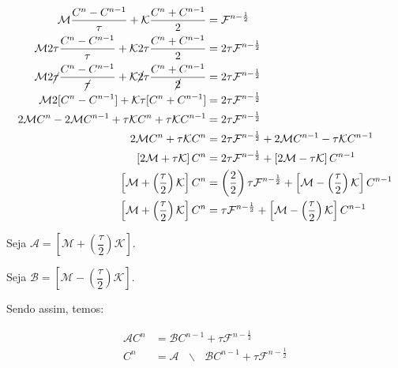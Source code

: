   \begin{align*}
    \mathcal{M} \dfrac{C^n - C^{n-1}}{\tau} + \mathcal{K} \dfrac{C^n + C^{n-1}}{2} &= \mathcal{F}^{n - \frac{1}{2}}\\
    \mathcal{M} 2\tau \dfrac{C^n - C^{n-1}}{\tau} + \mathcal{K} 2\tau \dfrac{C^n + C^{n-1}}{2} &= 2\tau \mathcal{F}^{n - \frac{1}{2}}\\
    \mathcal{M} 2\cancel{\tau} \dfrac{C^n - C^{n-1}}{\cancel{\tau}} + \mathcal{K} \cancel{2}\tau \dfrac{C^n + C^{n-1}}{\cancel{2}} &= 2\tau \mathcal{F}^{n - \frac{1}{2}}\\
    \mathcal{M} 2 [C^n - C^{n-1}] + \mathcal{K} \tau [C^n + C^{n-1}] &= 2\tau \mathcal{F}^{n - \frac{1}{2}}\\
    2\mathcal{M}C^n - 2\mathcal{M}C^{n-1} + \tau\mathcal{K}C^n + \tau\mathcal{K}C^{n-1} &= 2\tau \mathcal{F}^{n - \frac{1}{2}}\\
    2\mathcal{M}C^n + \tau\mathcal{K}C^n &= 2\tau \mathcal{F}^{n - \frac{1}{2}} + 2\mathcal{M}C^{n-1} - \tau\mathcal{K}C^{n-1}\\
    \left[2\mathcal{M} + \tau\mathcal{K}\right]C^n &= 2\tau \mathcal{F}^{n - \frac{1}{2}} + \left[2\mathcal{M} - \tau\mathcal{K}\right]C^{n-1} \\
    \left[\mathcal{M} + \left(\dfrac{\tau}{2}\right)\mathcal{K}\right]C^n &= \left(\dfrac{2}{2}\right)\tau \mathcal{F}^{n - \frac{1}{2}} + \left[\mathcal{M} - \left(\dfrac{\tau}{2}\right)\mathcal{K}\right]C^{n-1} \\
    \left[\mathcal{M} + \left(\dfrac{\tau}{2}\right)\mathcal{K}\right]C^n &= \tau \mathcal{F}^{n - \frac{1}{2}} + \left[\mathcal{M} - \left(\dfrac{\tau}{2}\right)\mathcal{K}\right]C^{n-1}
  \end{align*}

  Seja $\displaystyle \mathcal{A} = \left[\mathcal{M} + \left(\dfrac{\tau}{2}\right)\mathcal{K}\right]$.

  Seja $\displaystyle \mathcal{B} = \left[\mathcal{M} - \left(\dfrac{\tau}{2}\right)\mathcal{K}\right]$.

  Sendo assim, temos:

  \begin{align*}
    \mathcal{A} C^n &= \mathcal{B} C^{n-1} + \tau \mathcal{F}^{n - \frac{1}{2}} \\
    C^n &= \mathcal{A}\text{ }\backslash \text{ }\mathcal{B}C^{n-1} + \tau \mathcal{F}^{n - \frac{1}{2}}
  \end{align*}
